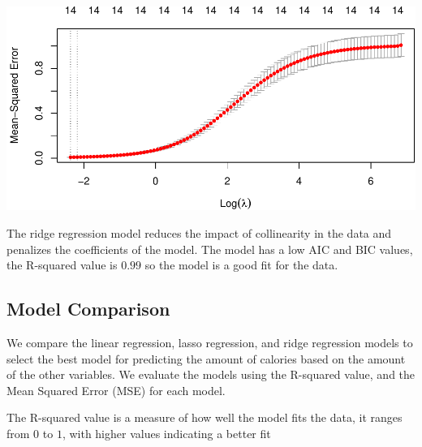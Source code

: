 \documentclass[
]{article}
\newenvironment{Shaded}{\begin{snugshade}}{\end{snugshade}}
\newcommand{\AttributeTok}[1]{\textcolor[rgb]{0.13,0.29,0.53}{#1}}
\newcommand{\ConstantTok}[1]{\textcolor[rgb]{0.56,0.35,0.01}{#1}}
\newcommand{\DecValTok}[1]{\textcolor[rgb]{0.00,0.00,0.81}{#1}}
\newcommand{\FunctionTok}[1]{\textcolor[rgb]{0.13,0.29,0.53}{\textbf{#1}}}
\newcommand{\NormalTok}[1]{#1}
\newcommand{\OtherTok}[1]{\textcolor[rgb]{0.56,0.35,0.01}{#1}}
\newcommand{\SpecialCharTok}[1]{\textcolor[rgb]{0.81,0.36,0.00}{\textbf{#1}}}
\newcommand{\StringTok}[1]{\textcolor[rgb]{0.31,0.60,0.02}{#1}}
\begin{document}
\begin{Shaded}
\end{Shaded}

\begin{center}\includegraphics{Statistical_Learning_Final_Report_files/figure-latex/ridge_regression-1} \end{center}

The ridge regression model reduces the impact of collinearity in the
data and penalizes the coefficients of the model. The model has a low
AIC and BIC values, the R-squared value is \(0.99\) so the model is a
good fit for the data.

\subsection{Model Comparison}\label{model-comparison}

We compare the linear regression, lasso regression, and ridge regression
models to select the best model for predicting the amount of calories
based on the amount of the other variables. We evaluate the models using
the R-squared value, and the Mean Squared Error (MSE) for each model.

The R-squared value is a measure of how well the model fits the data, it
ranges from \(0\) to \(1\), with higher values indicating a better fit
\end{document}
